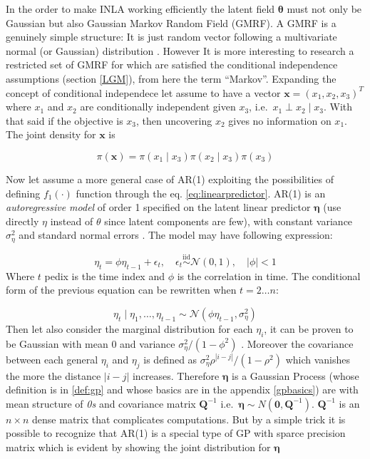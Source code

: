 \documentclass[
  12pt,
  a4paper,
  oneside]{book}
\theoremstyle{definition}
\theoremstyle{definition}
\theoremstyle{definition}
\theoremstyle{remark}
\begin{document}
In the order to make INLA working efficiently the latent field \(\boldsymbol\theta\) must not only be Gaussian but also Gaussian Markov Random Field (GMRF). A GMRF is a genuinely simple structure: It is just random vector following a multivariate normal (or Gaussian) distribution \citep{GMRFRue}. However It is more interesting to research a restricted set of GMRF for which are satisfied the conditional independence assumptions (section \ref{LGM}), from here the term ``Markov''. Expanding the concept of conditional independece let assume to have a vector \(\boldsymbol{\mathbf{x}}=\left(x_{1}, x_{2}, x_{3}\right)^{T}\) where \(x_1\) and \(x_2\) are conditionally independent given \(x_3\), i.e.~\(x_{1} \perp x_{2} \mid x_3\). With that said if the objective is \(x_3\), then uncovering \(x_2\) gives no information on \(x_1\). The joint density for \(\boldsymbol{\mathbf{x}}\) is

\begin{equation}
  \pi(\boldsymbol{\mathbf{x}})=\pi\left(x_{1} \mid x_{3}\right) \pi\left(x_{2} \mid x_{3}\right) \pi\left(x_{3}\right)
\label{eq:pix}
\end{equation}

Now let assume a more general case of AR(1) exploiting the possibilities of defining \(f_{1}(\cdot)\) function through the eq. \eqref{eq:linearpredictor}. AR(1) is an \emph{autoregressive model} of order 1 specified on the latent linear predictor \(\boldsymbol\eta\) (use directly \(\eta\) instead of \(\theta\) since latent components are few), with constant variance \(\sigma_{\eta}^{2}\) and standard normal errors \citetext{\citeyear{GMRFRue}; \citeyear{wang2018bayesian}}. The model may have following expression:

\[
\eta_t=\phi \eta_{t-1}+\epsilon_{t}, \quad \epsilon_{t} \stackrel{\mathrm{iid}}{\sim} \mathcal{N}(0,1), \quad|\phi|<1
\]
Where \(t\) pedix is the time index and \(\phi\) is the correlation in time. The conditional form of the previous equation can be rewritten when \(t = 2 \ldots n\):

\[
\eta_{t} \mid \eta_{1}, \ldots, \eta_{t-1} \sim \mathcal{N}\left(\phi \eta_{t-1}, \sigma_{\eta}^{2}\right)
\]
Then let also consider the marginal distribution for each \(\eta_i\), it can be proven to be Gaussian with mean 0 and variance \(\sigma_{\eta}^{2} /\left(1-\phi^{2}\right)\) \citeyearpar{wang2018bayesian}. Moreover the covariance between each general \(\eta_{i}\) and \(\eta_{j}\) is defined as \(\sigma_{\eta}^{2} \rho^{|i-j|} /\left(1-\rho^{2}\right)\) which vanishes the more the distance \(|i-j|\) increases.
Therefore \(\boldsymbol\eta\) is a Gaussian Process (whose definition is in \ref{def:gp} and whose basics are in the appendix \ref{gpbasics}) are with mean structure of \emph{0s} and covariance matrix \(\boldsymbol{Q}^{-1}\) i.e.~\(\boldsymbol{\eta} \sim N(\mathbf{0}, \boldsymbol{Q}^{-1})\). \(\boldsymbol{Q}^{-1}\) is an \(n \times n\) dense matrix that complicates computations.
But by a simple trick it is possible to recognize that AR(1) is a special type of GP with sparce precision matrix which is evident by showing the joint distribution for \(\boldsymbol\eta\)
\end{document}
